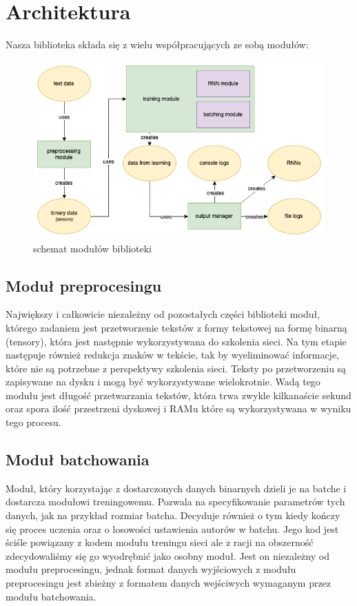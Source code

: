 \newpage
\section{Architektura}
Nasza biblioteka składa się z wielu współpracujących ze sobą modułów:
\begin{figure}[!ht]
\includegraphics[width=\linewidth]{./images/modules.png}
\caption{schemat modułów biblioteki}
\label{fig:test3}
\end{figure}

\subsection{Moduł preprocesingu}
Największy i całkowicie niezależny od pozostałych części biblioteki moduł, którego zadaniem jest 
przetworzenie tekstów z formy tekstowej na formę binarną (tensory), która jest następnie wykorzystywana
do szkolenia sieci. Na tym etapie następuje również redukcja znaków w tekście, tak by wyeliminować
informacje, które nie są potrzebne z perspektywy szkolenia sieci. Teksty po przetworzeniu są 
zapisywane na dysku i mogą być wykorzystywane wielokrotnie. 
Wadą tego modułu jest długość przetwarzania tekstów, która trwa zwykle kilkanaście sekund oraz spora ilość
przestrzeni dyskowej i RAMu które są wykorzystywana w wyniku tego procesu.

\subsection{Moduł batchowania}
Moduł, który korzystając z dostarczonych danych binarnych dzieli je na batche i dostarcza modułowi treningowemu.
Pozwala na specyfikowanie parametrów tych danych, jak na przykład rozmiar batcha.
Decyduje również o tym kiedy kończy się proces uczenia oraz o losowości ustawienia autorów w batchu. 
Jego kod jest ściśle powiązany z kodem modułu treningu sieci ale z racji na obszerność zdecydowaliśmy 
się go wyodrębnić jako osobny moduł. 
Jest on niezależny od modułu preprocesingu, jednak format danych wyjściowych z modułu preprocesingu 
jest zbieżny z formatem danych wejściwych wymaganym przez modułu batchowania. 

